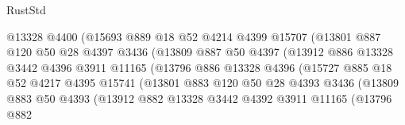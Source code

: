 \begin{lexlean}{RustStd}
\begin{coremodule}
                              @13328
                              @4400
                              (@15693
                                @889
                                @18
                                @52
                                @4214
                                @4399
                                @15707
                                (@13801
                                  @887
                                  @120
                                  @50
                                  @28
                                  @4397
                                  @3436
                                  (@13809
                                    @887
                                    @50
                                    @4397
                                    (@13912
                                      @886
                                      @13328
                                      @3442
                                      @4396
                                      @3911
                                      @11165
                                      (@13796
                                        @886
                                        @13328
                                        @4396
                                        (@15727
                                          @885
                                          @18
                                          @52
                                          @4217
                                          @4395
                                          @15741
                                          (@13801
                                            @883
                                            @120
                                            @50
                                            @28
                                            @4393
                                            @3436
                                            (@13809
                                              @883
                                              @50
                                              @4393
                                              (@13912
                                                @882
                                                @13328
                                                @3442
                                                @4392
                                                @3911
                                                @11165
                                                (@13796
                                                  @882

\end{coremodule}
\end{lexlean}
